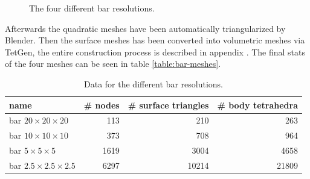 \begin{figure}
  \centering
  \newline
  \caption{The four different bar resolutions.}
  \label{fig:blender-bars}
\end{figure}

Afterwards the quadratic meshes have been automatically triangularized
by Blender. Then the surface meshes has been converted into volumetric
meshes via TetGen, the entire construction process is described in
appendix . The final stats of the four
meshes can be seen in table \vref{table:bar-meshes}.

\begin{table}
  \centering
  \begin{tabular}{| l | r | r | r |}
    \hline
    name & \# nodes & \# surface triangles & \# body tetrahedra \\
    \hline
    bar $20 \times 20 \times 20$ & 113 & 210 & 263 \\
    bar $10 \times 10 \times 10$ & 373 & 708 & 964\\
    bar $5 \times 5 \times 5$ & 1619 & 3004 & 4658 \\
    bar $2.5 \times 2.5 \times 2.5$ & 6297 & 10214 & 21809 \\
    \hline
  \end{tabular}
  \caption{Data for the different bar resolutions.}
  \label{table:bar-meshes}
\end{table}

